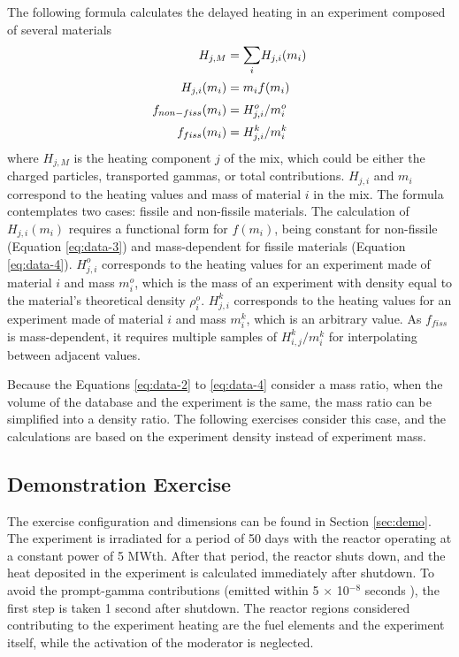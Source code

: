 The following formula calculates the delayed heating in an experiment composed of several materials
\begin{align}
H_{j,M} &= \mathlarger{\sum}_i H_{j,i}(m_i)  \label{eq:data-1} \\
H_{j,i}(m_i) &= m_i f(m_i)  \label{eq:data-2} \\
f_{non-fiss}(m_i) &= H_{j,i}^o / m_i^o  \label{eq:data-3} \\
f_{fiss}(m_i) &= H_{j,i}^k / m_i^k  \label{eq:data-4}
\end{align}
where $H_{j, M}$ is the heating component $j$ of the mix, which could be either the charged particles, transported gammas, or total contributions.
$H_{j,i}$ and $m_i$ correspond to the heating values and mass of material $i$ in the mix.
The formula contemplates two cases: fissile and non-fissile materials.
The calculation of $H_{j,i}(m_i)$ requires a functional form for $f(m_i)$, being constant for non-fissile (Equation \ref{eq:data-3}) and mass-dependent for fissile materials (Equation \ref{eq:data-4}).
$H_{j,i}^o$ corresponds to the heating values for an experiment made of material $i$ and mass $m_i^o$, which is the mass of an experiment with density equal to the material's theoretical density $\rho_i^o$.
$H_{j,i}^k$ corresponds to the heating values for an experiment made of material $i$ and mass $m_i^k$, which is an arbitrary value.
As $f_{fiss}$ is mass-dependent, it requires multiple samples of $H_{i,j}^k/m_i^k$ for interpolating between adjacent values.

Because the Equations \ref{eq:data-2} to \ref{eq:data-4} consider a mass ratio, when the volume of the database and the experiment is the same, the mass ratio can be simplified into a density ratio.
The following exercises consider this case, and the calculations are based on the experiment density instead of experiment mass.



\subsection{Demonstration Exercise}

The exercise configuration and dimensions can be found in Section \ref{sec:demo}.
The experiment is irradiated for a period of 50 days with the reactor operating at a constant power of 5 MWth.
After that period, the reactor shuts down, and the heat deposited in the experiment is calculated immediately after shutdown.
To avoid the prompt-gamma contributions (emitted within 5 $\times$ 10$^{-8}$ seconds \cite{ilas_impact_2013}), the first step is taken 1 second after shutdown.
The reactor regions considered contributing to the experiment heating are the fuel elements and the experiment itself, while the activation of the moderator is neglected.

